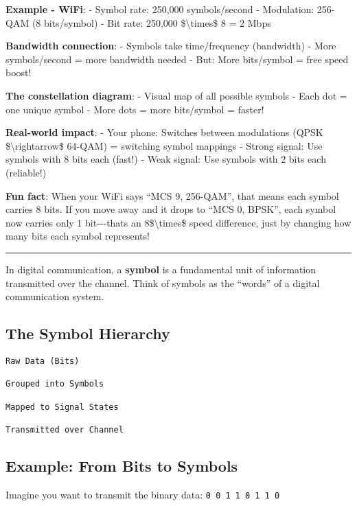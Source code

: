 \textbf{Example - WiFi}: - Symbol rate: 250,000 symbols/second -
Modulation: 256-QAM (8 bits/symbol) - Bit rate: 250,000
\$\textbackslash times\$ 8 = 2 Mbps

\textbf{Bandwidth connection}: - Symbols take time/frequency (bandwidth)
- More symbols/second = more bandwidth needed - But: More bits/symbol =
free speed boost!

\textbf{The constellation diagram}: - Visual map of all possible symbols
- Each dot = one unique symbol - More dots = more bits/symbol = faster!

\textbf{Real-world impact}: - Your phone: Switches between modulations
(QPSK \$\textbackslash rightarrow\$ 64-QAM) = switching symbol mappings
- Strong signal: Use symbols with 8 bits each (fast!) - Weak signal: Use
symbols with 2 bits each (reliable!)

\textbf{Fun fact}: When your WiFi says ``MCS 9, 256-QAM'', that means
each symbol carries 8 bits. If you move away and it drops to ``MCS 0,
BPSK'', each symbol now carries only 1 bit-\/-\/-that\textquotesingle s
an 8\$\textbackslash times\$ speed difference, just by changing how many
bits each symbol represents!

\begin{center}\rule{0.5\linewidth}{0.5pt}\end{center}

In digital communication, a \textbf{symbol} is a fundamental unit of
information transmitted over the channel. Think of symbols as the
``words'' of a digital communication system.

\subsection{The Symbol Hierarchy}\label{the-symbol-hierarchy}

\begin{verbatim}
Raw Data (Bits)
    
Grouped into Symbols
    
Mapped to Signal States
    
Transmitted over Channel
\end{verbatim}

\subsection{Example: From Bits to
Symbols}\label{example-from-bits-to-symbols}

Imagine you want to transmit the binary data:
\texttt{0\ 0\ 1\ 1\ 0\ 1\ 1\ 0}


